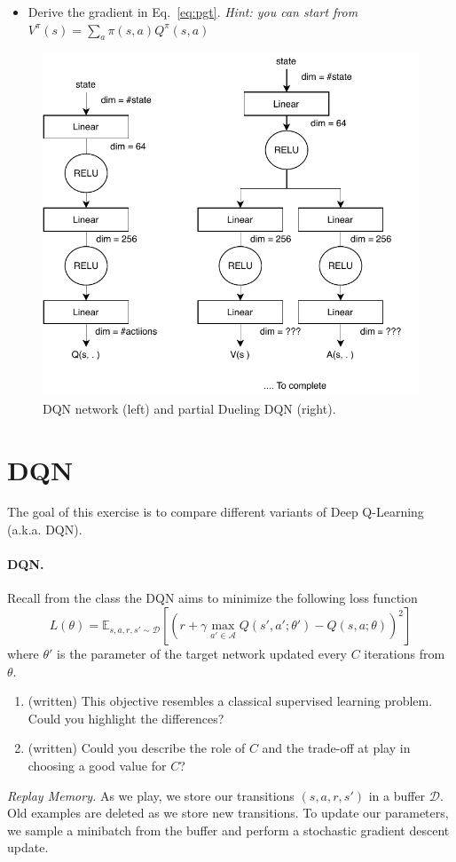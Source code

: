 \documentclass[a4paper]{article}
\begin{document}
\begin{itemize}
    \item Derive the gradient in Eq.~\ref{eq:pgt}. \emph{Hint: you can start from $V^{\pi}(s) = \sum_a \pi(s,a) Q^{\pi}(s,a)$}
\end{itemize}
\begin{figure}
    \centering
    \includegraphics[width=.4\textwidth]{Untitled}
    \caption{DQN network (left) and partial Dueling DQN (right).}
    \label{fig:net}
    \vspace{-50pt}
\end{figure}

\section{DQN}
The goal of this exercise is to compare different variants of Deep Q-Learning (a.k.a. DQN).

\paragraph{DQN.} Recall from the class the DQN aims to minimize the following loss function
\[
    L(\theta) = \mathbb{E}_{s,a,r,s' \sim \mathcal{D}} \left[
\left(
    r + \gamma \max_{a' \in\mathcal{A}} Q(s',a';\theta') - Q(s,a; \theta)
\right)^2
    \right ]
\]
where $\theta'$ is the parameter of the target network updated every $C$ iterations from $\theta$.
\begin{enumerate}
    \item (written) This objective resembles a classical supervised learning problem. Could you highlight the differences?
    \item (written) Could you describe the role of $C$ and the trade-off at play in choosing a good value for $C$?
\end{enumerate}


\vspace{.2in}
\emph{Replay Memory.} As we play, we store our transitions $(s, a, r, s')$ in a buffer $\mathcal{D}$. Old examples are deleted as we store new transitions. To update our parameters, we sample a minibatch from the buffer and perform a stochastic gradient descent update.
\end{document}
